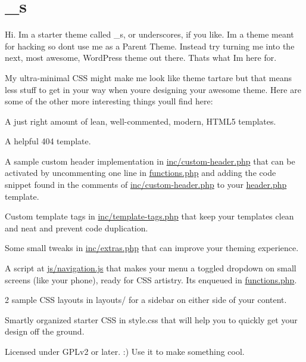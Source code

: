 

\section*{\+\_\+s }

Hi. I\textquotesingle{}m a starter theme called {\ttfamily \+\_\+s}, or {\ttfamily underscores}, if you like. I\textquotesingle{}m a theme meant for hacking so don\textquotesingle{}t use me as a Parent Theme. Instead try turning me into the next, most awesome, Word\+Press theme out there. That\textquotesingle{}s what I\textquotesingle{}m here for.

My ultra-\/minimal C\+S\+S might make me look like theme tartare but that means less stuff to get in your way when you\textquotesingle{}re designing your awesome theme. Here are some of the other more interesting things you\textquotesingle{}ll find here\+:


\begin{DoxyItemize}
\item A just right amount of lean, well-\/commented, modern, H\+T\+M\+L5 templates.
\item A helpful 404 template.
\item A sample custom header implementation in {\ttfamily \hyperlink{custom-header_8php}{inc/custom-\/header.\+php}} that can be activated by uncommenting one line in {\ttfamily \hyperlink{functions_8php}{functions.\+php}} and adding the code snippet found in the comments of {\ttfamily \hyperlink{custom-header_8php}{inc/custom-\/header.\+php}} to your {\ttfamily \hyperlink{header_8php}{header.\+php}} template.
\item Custom template tags in {\ttfamily \hyperlink{template-tags_8php}{inc/template-\/tags.\+php}} that keep your templates clean and neat and prevent code duplication.
\item Some small tweaks in {\ttfamily \hyperlink{extras_8php}{inc/extras.\+php}} that can improve your theming experience.
\item A script at {\ttfamily \hyperlink{navigation_8js}{js/navigation.\+js}} that makes your menu a toggled dropdown on small screens (like your phone), ready for C\+S\+S artistry. It\textquotesingle{}s enqueued in {\ttfamily \hyperlink{functions_8php}{functions.\+php}}.
\item 2 sample C\+S\+S layouts in {\ttfamily layouts/} for a sidebar on either side of your content.
\item Smartly organized starter C\+S\+S in {\ttfamily style.\+css} that will help you to quickly get your design off the ground.
\item Licensed under G\+P\+Lv2 or later. \+:) Use it to make something cool.
\end{DoxyItemize}

